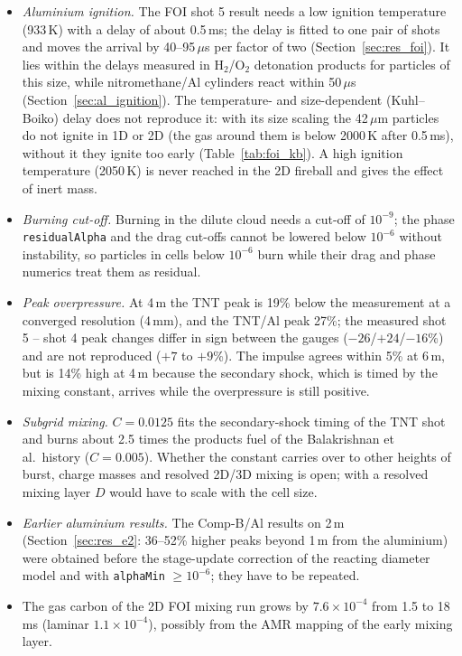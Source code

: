 \documentclass{article}
\begin{document}
\begin{itemize}
    \item \emph{Aluminium ignition.} The FOI shot 5 result needs a low ignition temperature (933\,K) with a delay of about 0.5\,ms; the delay is fitted to one pair of shots and moves the arrival by 40--95\,$\mu$s per factor of two (Section~\ref{sec:res_foi}). It lies within the delays measured in H$_2$/O$_2$ detonation products for particles of this size, while nitromethane/Al cylinders react within 50\,$\mu$s (Section~\ref{sec:al_ignition}). The temperature- and size-dependent (Kuhl--Boiko) delay does not reproduce it: with its size scaling the 42\,$\mu$m particles do not ignite in 1D or 2D (the gas around them is below 2000\,K after 0.5\,ms), without it they ignite too early (Table~\ref{tab:foi_kb}). A high ignition temperature (2050\,K) is never reached in the 2D fireball and gives the effect of inert mass.
    \item \emph{Burning cut-off.} Burning in the dilute cloud needs a cut-off of $10^{-9}$; the phase \texttt{residualAlpha} and the drag cut-offs cannot be lowered below $10^{-6}$ without instability, so particles in cells below $10^{-6}$ burn while their drag and phase numerics treat them as residual.
    \item \emph{Peak overpressure.} At 4\,m the TNT peak is 19\% below the measurement at a converged resolution (4\,mm), and the TNT/Al peak 27\%; the measured shot 5 -- shot 4 peak changes differ in sign between the gauges ($-26$/$+24$/$-16$\%) and are not reproduced ($+7$ to $+9$\%). The impulse agrees within 5\% at 6\,m, but is 14\% high at 4\,m because the secondary shock, which is timed by the mixing constant, arrives while the overpressure is still positive.
    \item \emph{Subgrid mixing.} $C = 0.0125$ fits the secondary-shock timing of the TNT shot and burns about 2.5 times the products fuel of the Balakrishnan et al.\ history ($C = 0.005$). Whether the constant carries over to other heights of burst, charge masses and resolved 2D/3D mixing is open; with a resolved mixing layer $D$ would have to scale with the cell size.
    \item \emph{Earlier aluminium results.} The Comp-B/Al results on 2\,m (Section~\ref{sec:res_e2}: 36--52\% higher peaks beyond 1\,m from the aluminium) were obtained before the stage-update correction of the reacting diameter model and with \texttt{alphaMin} $\ge 10^{-6}$; they have to be repeated.
    \item The gas carbon of the 2D FOI mixing run grows by $7.6\times10^{-4}$ from 1.5 to 18\,ms (laminar $1.1\times10^{-4}$), possibly from the AMR mapping of the early mixing layer.

\end{itemize}
\end{document}

